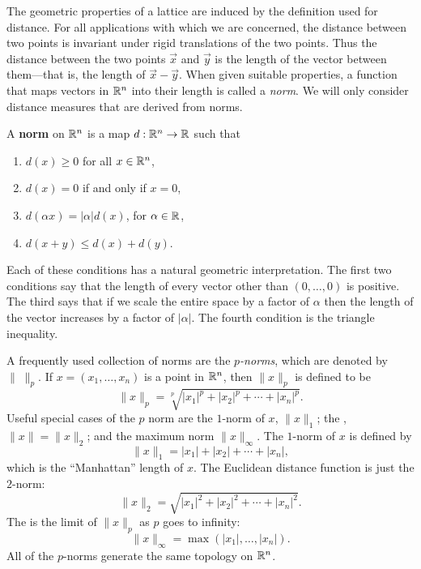 The geometric properties of a lattice are induced by the definition
used for distance.  For all applications with which we are concerned,
the distance between two points is invariant under rigid translations
of the two points.  Thus the distance between the two points $\vec{x}$
and $\vec{y}$ is the length of the vector between them---that is, the
length of $\vec{x}-\vec{y}$.  When given suitable properties, a function
that maps vectors in $\mathbb{R}^n$ into their length is called a {\em norm}.
We will only consider distance measures that are derived from norms.

\begin{definition}
A {\bf norm} on $\mathbb{R}^{n}$ is a map $d: \mathbb{R}^{n} \rightarrow \mathbb{R}$ such that 
\begin{enumerate}
\item $d(x) \ge 0$ for all $x \in \mathbb{R}^{n}$,
\item $d(x) = 0$ if and only if $x = 0$,
\item $d(\alpha x) = |\alpha| d(x)$, for $\alpha \in \mathbb{R}$,
\item $d(x+y) \le d(x) + d(y)$.
\end{enumerate}
\end{definition}

Each of these conditions has a natural geometric interpretation.  The
first two conditions say that the length of every vector other than
$(0, \ldots, 0)$ is positive.  The third says that if we scale the
entire space by a factor of $\alpha$ then the length of the vector
increases by a factor of $|\alpha|$.  The fourth condition is the
triangle inequality.

A frequently used collection of norms are the {\em
$p$-norms}, which are
denoted by $\|\;\|_{p}$.  If $x = (x_{1}, \ldots, x_{n})$ is a point
in $\mathbb{R}^{n}$, then $\|x\|_{p}$ is defined to be
\[
\|x\|_{p} = \sqrt[p]{|x_{1}|^{p} + |x_{2}|^{p} + \cdots + |x_{n}|^{p}}.
\]
Useful special cases of the $p$ norm are the $1$-norm of $x$,
$\|x\|_{1}$; the , $\|x\| = \|x\|_{2}$; and the
maximum norm $\|x\|_{\infty}$.  The $1$-norm of $x$ is defined by
\[
\|x\|_{1} = |x_{1}| + |x_{2}| + \cdots + |x_{n}|,
\]
which is the ``Manhattan'' length of $x$. The
Euclidean distance function is just the $2$-norm:
\[
\|x\|_{2} = \sqrt{|x_{1}|^{2} + |x_{2}|^{2} + \cdots + |x_{n}|^{2}}.
\]
The  is the limit of $\|x\|_{p}$ as $p$ goes to
infinity:
\[
\|x\|_{\infty} = \max (|x_{1}|, \ldots, |x_{n}|).
\]
All of the $p$-norms generate the same topology on $\mathbb{R}^{n}$.

